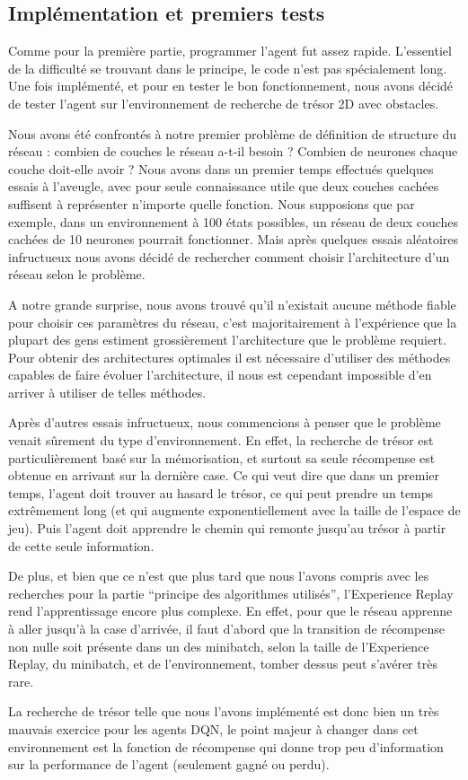 \subsection{Implémentation et premiers tests}
Comme pour la première partie, programmer l'agent fut assez rapide. L'essentiel de la difficulté se trouvant dans le principe, le code n'est pas spécialement long. Une fois implémenté, et pour en tester le bon fonctionnement, nous avons décidé de tester l'agent sur l'environnement de recherche de trésor 2D avec obstacles.
\par
Nous avons été confrontés à notre premier problème de définition de structure du réseau : combien de couches le réseau a-t-il besoin ? Combien de neurones chaque couche doit-elle avoir ?
Nous avons dans un premier temps effectués quelques essais à l'aveugle, avec pour seule connaissance utile que deux couches cachées suffisent à représenter n'importe quelle fonction. Nous supposions que par exemple, dans un environnement à 100 états possibles, un réseau de deux couches cachées de 10 neurones pourrait fonctionner. Mais après quelques essais aléatoires infructueux nous avons décidé de rechercher comment choisir l'architecture d'un réseau selon le problème.
\par
A notre grande surprise, nous avons trouvé qu'il n'existait aucune méthode fiable pour choisir ces paramètres du réseau, c'est majoritairement à l'expérience que la plupart des gens estiment grossièrement l'architecture que le problème requiert. Pour obtenir des architectures optimales il est nécessaire d'utiliser des méthodes capables de faire évoluer l'architecture, il nous est cependant impossible d'en arriver à utiliser de telles méthodes.
\par
Après d'autres essais infructueux, nous commencions à penser que le problème venait sûrement du type d'environnement. En effet, la recherche de trésor est particulièrement basé sur la mémorisation, et surtout sa seule récompense est obtenue en arrivant sur la dernière case. Ce qui veut dire que dans un premier temps, l'agent doit trouver au hasard le trésor, ce qui peut prendre un temps extrêmement long (et qui augmente exponentiellement avec la taille de l'espace de jeu). Puis l'agent doit apprendre le chemin qui remonte jusqu'au trésor à partir de cette seule information. 
\par
De plus, et bien que ce n'est que plus tard que nous l'avons compris avec les recherches pour la partie ``principe des algorithmes utilisés'', l'Experience Replay rend l'apprentissage encore plus complexe. En effet, pour que le réseau apprenne à aller jusqu'à la case d'arrivée, il faut d'abord que la transition de récompense non nulle soit présente dans un des minibatch, selon la taille de l'Experience Replay, du minibatch, et de l'environnement, tomber dessus peut s'avérer très rare.
\par
La recherche de trésor telle que nous l'avons implémenté est donc bien un très mauvais exercice pour les agents DQN, le point majeur à changer dans cet environnement est la fonction de récompense qui donne trop peu d'information sur la performance de l'agent (seulement gagné ou perdu).

